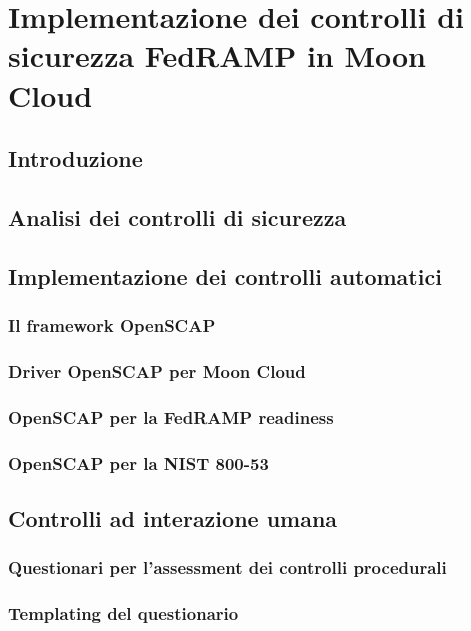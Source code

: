 \documentclass[../main.tex]{subfiles}
\begin{document}
\chapter{Implementazione dei controlli di sicurezza FedRAMP in Moon Cloud}
\section{Introduzione}
\section{Analisi dei controlli di sicurezza}
\section{Implementazione dei controlli automatici}
\subsection{Il framework OpenSCAP}
\subsection{Driver OpenSCAP per Moon Cloud}
\subsection{OpenSCAP per la FedRAMP readiness}
\subsection{OpenSCAP per la NIST 800-53}
\section{Controlli ad interazione umana}
\subsection{Questionari per l'assessment dei controlli procedurali}
\subsection{Templating del questionario}
\end{document}
